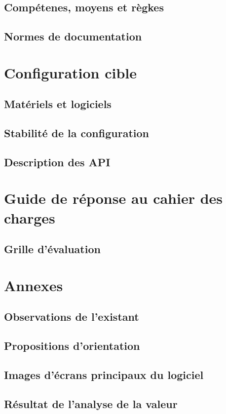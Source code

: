 \documentclass[a4paper]{article}
\begin{document}
\subsection{Compétenes, moyens et règkes}
\subsection{Normes de documentation}

\section{Configuration cible}
\subsection{Matériels et logiciels}
\subsection{Stabilité de la configuration}
\subsection{Description des API}

\section{Guide de réponse au cahier des charges}
\subsection{Grille d'évaluation}

\section{Annexes}
\subsection{Observations de l'existant}
\subsection{Propositions d'orientation}
\subsection{Images d'écrans principaux du logiciel}
\subsection{Résultat de l'analyse de la valeur}


\end{document}
